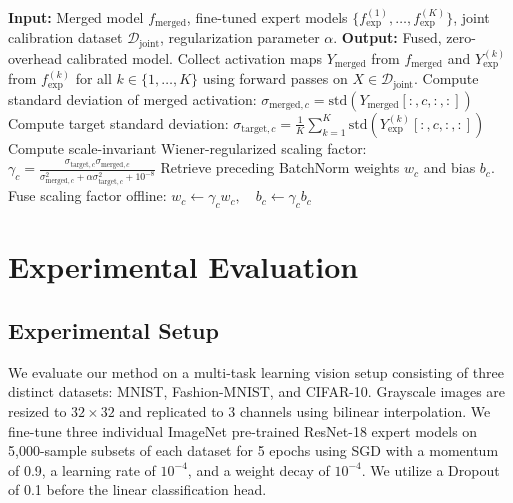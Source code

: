 \documentclass{article}
\theoremstyle{plain}
\theoremstyle{definition}
\theoremstyle{remark}
\begin{document}
\begin{algorithm}[tb]
\caption{Wiener-Regularized Spatial Calibration (WRSC) and Parameter Fusion}
\label{alg:wrsc}
\begin{algorithmic}[1]
\STATE \textbf{Input:} Merged model $f_{\text{merged}}$, fine-tuned expert models $\{f_{\text{exp}}^{(1)}, \dots, f_{\text{exp}}^{(K)}\}$, joint calibration dataset $\mathcal{D}_{\text{joint}}$, regularization parameter $\alpha$.
\STATE \textbf{Output:} Fused, zero-overhead calibrated model.
    \STATE Collect activation maps $Y_{\text{merged}}$ from $f_{\text{merged}}$ and $Y_{\text{exp}}^{(k)}$ from $f_{\text{exp}}^{(k)}$ for all $k \in \{1, \dots, K\}$ using forward passes on $X \in \mathcal{D}_{\text{joint}}$.
        \STATE Compute standard deviation of merged activation:
        \STATE $\sigma_{\text{merged}, c} = \text{std}(Y_{\text{merged}}[:, c, :, :])$
        \STATE Compute target standard deviation:
        \STATE $\sigma_{\text{target}, c} = \frac{1}{K}\sum_{k=1}^K \text{std}(Y_{\text{exp}}^{(k)}[:, c, :, :])$
        \STATE Compute scale-invariant Wiener-regularized scaling factor:
        \STATE $\gamma_c = \frac{\sigma_{\text{target}, c} \sigma_{\text{merged}, c}}{\sigma_{\text{merged}, c}^2 + \alpha \sigma_{\text{target}, c}^2 + 10^{-8}}$
        \STATE Retrieve preceding BatchNorm weights $w_c$ and bias $b_c$.
        \STATE Fuse scaling factor offline:
        \STATE $w_c \leftarrow \gamma_c w_c, \quad b_c \leftarrow \gamma_c b_c$
    \ENDFOR
\ENDFOR
\end{algorithmic}
\end{algorithm}

\section{Experimental Evaluation}
\label{sec:experiments}

\subsection{Experimental Setup}
We evaluate our method on a multi-task learning vision setup consisting of three distinct datasets: MNIST, Fashion-MNIST, and CIFAR-10. Grayscale images are resized to $32 \times 32$ and replicated to 3 channels using bilinear interpolation. We fine-tune three individual ImageNet pre-trained ResNet-18 expert models on 5,000-sample subsets of each dataset for 5 epochs using SGD with a momentum of 0.9, a learning rate of $10^{-4}$, and a weight decay of $10^{-4}$. We utilize a Dropout of 0.1 before the linear classification head.
\end{document}
